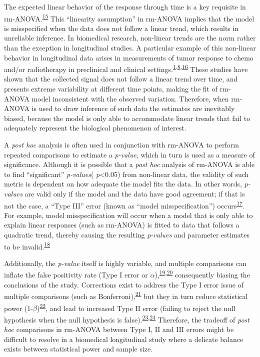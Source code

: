 \documentclass[
]{article}
\begin{document}
The expected linear behavior of the response through time is a key requisite in rm-ANOVA.\textsuperscript{\protect\hyperlink{ref-pinheiro2006}{15}} This ``linearity assumption'' in rm-ANOVA implies that the model is misspecified when the data does not follow a linear trend, which results in unreliable inference. In biomedical research, non-linear trends are the norm rather than the exception in longitudinal studies. A particular example of this non-linear behavior in longitudinal data arises in measurements of tumor response to chemo and/or radiotherapy in preclinical and clinical settings.\textsuperscript{\protect\hyperlink{ref-roblyer2011}{1},\protect\hyperlink{ref-skala2010}{8},\protect\hyperlink{ref-vishwanath2009}{16}} These studies have shown that the collected signal does not follow a linear trend over time, and presents extreme variability at different time points, making the fit of rm-ANOVA model inconsistent with the observed variation. Therefore, when rm-ANOVA is used to draw inference of such data the estimates are inevitably biased, because the model is only able to accommodate linear trends that fail to adequately represent the biological phenomenon of interest.

A \emph{post hoc} analysis is often used in conjunction with rm-ANOVA to perform repeated comparisons to estimate a \emph{p-value}, which in turn is used as a measure of significance.
Although it is possible that a \emph{post hoc} analysis of rm-ANOVA is able to find ``significant'' \emph{p-values}( \emph{p}\textless0.05) from non-linear data, the validity of such metric is dependent on how adequate the model fits the data. In other words, \emph{p-values} are valid only if the model and the data have good agreement; if that is not the case, a ``Type III'' error (known as ``model misspecification'') occurs\textsuperscript{\protect\hyperlink{ref-dennis2019}{17}}. For example, model misspecification will occur when a model that is only able to explain linear responses (such as rm-ANOVA) is fitted to data that follows a quadratic trend, thereby causing the resulting \emph{p-values} and parameter estimates to be invalid.\textsuperscript{\protect\hyperlink{ref-wang2019}{18}}

Additionally, the \emph{p-value} itself is highly variable, and multiple comparisons can inflate the false positivity rate (Type I error or \(\alpha\)),\textsuperscript{\protect\hyperlink{ref-liu2010}{19},\protect\hyperlink{ref-halsey2015}{20}} consequently biasing the conclusions of the study. Corrections exist to address the Type I error issue of multiple comparisons (such as Bonferroni),\textsuperscript{\protect\hyperlink{ref-abdi2010}{21}} but they in turn reduce statistical power (1-\(\beta\))\textsuperscript{\protect\hyperlink{ref-nakagawa2004}{22}}, and lead to increased Type II error (failing to reject the null hypothesis when the null hypothesis is false).\textsuperscript{\protect\hyperlink{ref-gelman2012}{23},\protect\hyperlink{ref-albers2019}{24}} Therefore, the tradeoff of \emph{post hoc} comparisons in rm-ANOVA between Type I, II and III errors might be difficult to resolve in a biomedical longitudinal study where a delicate balance exists between statistical power and sample size.
\end{document}
